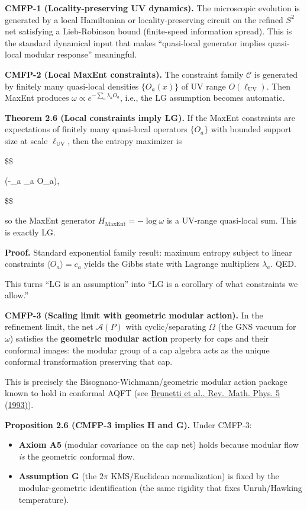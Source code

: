 \documentclass[11pt,a4paper]{article}
\theoremstyle{remark}
\providecommand{\tightlist}{%
  \setlength{\itemsep}{0pt}\setlength{\parskip}{0pt}}
\begin{document}
\textbf{CMFP-1 (Locality-preserving UV dynamics).} The microscopic evolution is
generated by a local Hamiltonian or locality-preserving circuit on the refined
\(S^2\) net satisfying a Lieb-Robinson bound (finite-speed information spread).
This is the standard dynamical input that makes ``quasi-local generator implies
quasi-local modular response'' meaningful.

\textbf{CMFP-2 (Local MaxEnt constraints).} The constraint family \(\mathcal{C}\) is
generated by finitely many quasi-local densities \(\{O_a(x)\}\) of UV range
\(O(\ell_{\mathrm{UV}})\). Then MaxEnt produces \(\omega \propto e^{-\sum_a \lambda_a O_a}\),
i.e., the LG assumption becomes automatic.

\textbf{Theorem 2.6 (Local constraints imply LG).} If the MaxEnt constraints are
expectations of finitely many quasi-local operators \(\{O_a\}\) with bounded
support size at scale \(\ell_{\mathrm{UV}}\), then the entropy maximizer is

\$\$

\omega \propto \exp\left(-\sum\_a \lambda\_a O\_a\right),

\$\$

so the MaxEnt generator \(H_{\mathrm{MaxEnt}} = -\log \omega\) is a UV-range
quasi-local sum. This is exactly LG.

\textbf{Proof.} Standard exponential family result: maximum entropy subject to
linear constraints \(\langle O_a \rangle = c_a\) yields the Gibbs state with
Lagrange multipliers \(\lambda_a\). QED.

This turns ``LG is an assumption'' into ``LG is a corollary of what constraints we
allow.''

\textbf{CMFP-3 (Scaling limit with geometric modular action).} In the refinement
limit, the net \(\mathcal{A}(P)\) with cyclic/separating \(\Omega\) (the GNS vacuum
for \(\omega\)) satisfies the \textbf{geometric modular action} property for caps and
their conformal images: the modular group of a cap algebra acts as the unique
conformal transformation preserving that cap.

This is precisely the Bisognano-Wichmann/geometric modular action package known
to hold in conformal AQFT (see
\href{https://arxiv.org/abs/funct-an/9302008}{Brunetti et al., Rev.~Math. Phys. 5 (1993)}).

\textbf{Proposition 2.6 (CMFP-3 implies H and G).} Under CMFP-3:

\begin{itemize}
\tightlist
\item
  \textbf{Axiom A5} (modular covariance on the cap net) holds because modular
  flow \emph{is} the geometric conformal flow.
\item
  \textbf{Assumption G} (the \(2\pi\) KMS/Euclidean normalization) is fixed by the
  modular-geometric identification (the same rigidity that fixes
  Unruh/Hawking temperature).
\end{itemize}
\end{document}
